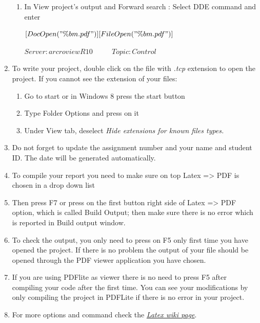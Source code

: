 \documentclass[paper=letter, fontsize=11pt]{scrartcl} %
\numberwithin{equation}{section} %
\numberwithin{figure}{section} %
\numberwithin{table}{section} %
\begin{document}
\begin{enumerate}
\begin {enumerate}
\begin{enumerate}
			$C:... \backslash Program Files  \backslash Adobe \backslash Reader 10.0 \backslash Reader \backslash AcroRd32.exe$
			\item	In View project's output and Forward search : Select DDE command and enter
			
			 $[DocOpen("\%bm.pdf")][FileOpen("\%bm.pdf")]$ 
			
			 $Server: arcroviewR10$ ~~~~  $Topic: Control$
		\end{enumerate}
	\end {enumerate}
\item To write your project, double click on the file with \textit{.tcp} extension to open the project. If you cannot see the extension of your files:
	\begin{enumerate}
		\item Go to start or in Windows 8 press the start button
		\item Type Folder Options and press on it
		\item Under View tab, deselect \textit{Hide extensions for known files types.}
	\end {enumerate}

\item Do not forget to update the assignment number and your name and student ID. The date will be generated automatically.
\item To compile your report you need to make sure on top Latex => PDF is chosen in a drop down list	
\item Then press F7 or press on the first button right side of Latex => PDF option, which is called Build Output;  then make sure there is no error which is reported in Build output window.
\item To check the output, you only need to press on F5 only first time you have opened the project. If there is no problem the output of your file should be opened through the PDF viewer application you have chosen.
\item If you are using PDFlite as viewer there is no need to press F5 after compiling your code after the first time. You can see your modifications by only compiling the project in PDFLite if there is no error in your project.
\item For more options and command check the \href{https://en.wikibooks.org/wiki/LaTeX}{\textit{Latex wiki page}}.
\end{enumerate}







\end{document}
